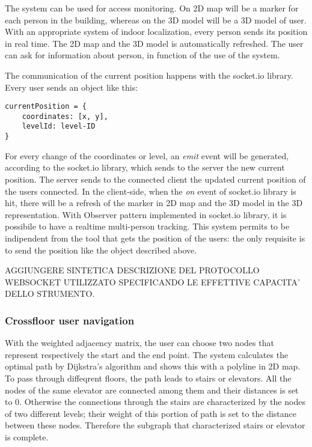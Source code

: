 \documentclass[]{article}
\begin{document}
The system can be used for access monitoring. On 2D map will be a marker
for each person in the building, whereas on the 3D model will be a 3D
model of user. With an appropriate system of indoor localization, every
person sends its position in real time. The 2D map and the 3D model is
automatically refreshed. The user can ask for information about person,
in function of the use of the system.

The communication of the current position happens with the socket.io
library. Every user sends an object like this:

\begin{verbatim}
currentPosition = {
    coordinates: [x, y],
    levelId: level-ID  
}
\end{verbatim}

For every change of the coordinates or level, an \emph{emit} event will
be generated, according to the socket.io library, which sends to the
server the new current position. The server sends to the connected
client the updated current position of the users connected. In the
client-side, when the \emph{on} event of socket.io library is hit, there
will be a refresh of the marker in 2D map and the 3D model in the 3D
representation. With Observer pattern implemented in socket.io library,
it is possibile to have a realtime multi-person tracking. This system
permits to be indipendent from the tool that gets the position of the
users: the only requisite is to send the position like the object
described above.

AGGIUNGERE SINTETICA DESCRIZIONE DEL PROTOCOLLO WEBSOCKET UTILIZZATO
SPECIFICANDO LE EFFETTIVE CAPACITA' DELLO STRUMENTO.

\subsubsection{Crossfloor user
navigation}\label{crossfloor-user-navigation}

With the weighted adjacency matrix, the user can choose two nodes that
represent respectively the start and the end point. The system
calculates the optimal path by Dijkstra's algorithm and shows this with
a polyline in 2D map. To pass through diffeqrent floors, the path leads
to stairs or elevators. All the nodes of the same elevator are connected
among them and their distances is set to 0. Otherwise the connections
through the stairs are characterized by the nodes of two different
levels; their weight of this portion of path is set to the distance
between these nodes. Therefore the subgraph that characterized stairs or
elevator is complete.
\end{document}
